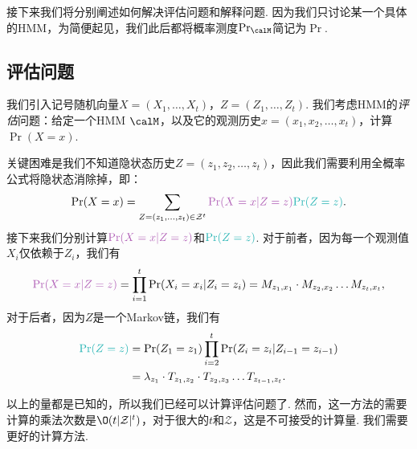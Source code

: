 接下来我们将分别阐述如何解决评估问题和解释问题. 因为我们只讨论某一个具体的HMM，为简便起见，我们此后都将概率测度$\Pr_\calM$简记为$\Pr$.

\subsection{评估问题}

我们引入记号随机向量$X=(X_1,\dots,X_t)$，$Z=(Z_1,\dots,Z_t)$. 我们考虑HMM的\emph{评估}问题：给定一个HMM $\calM$，以及它的观测历史$x=(x_1,x_2,\dots,x_t)$，计算$\Pr(X=x)$. 

关键困难是我们不知道隐状态历史$Z=(z_1,z_2,\dots,z_t)$，因此我们需要利用全概率公式将隐状态消除掉，即：
\[
    \Pr(X=x) =\sum_{Z=(z_1, \dots, z_t) \in \mathcal Z^t} \textcolor{Orchid}{\Pr(X=x|Z=z)}\textcolor{TealBlue}{\Pr(Z=z)}.
\]
接下来我们分别计算$\textcolor{Orchid}{\Pr(X=x|Z=z)}$和$\textcolor{TealBlue}{\Pr(Z=z)}$. 对于前者，因为每一个观测值$X_i$仅依赖于$Z_i$，我们有
\[
    \textcolor{Orchid}{\Pr(X=x|Z=z)} = \prod_{i=1}^t \Pr(X_i = x_i| Z_i = z_i) = M_{z_1,x_1}\cdot M_{z_2,x_2}\dots M_{z_t,x_t},
\]
对于后者，因为$Z$是一个Markov链，我们有
\begin{align*}
    \textcolor{TealBlue}{\Pr(Z=z)} &= \Pr(Z_1 = z_1) \prod_{i=2}^t\Pr(Z_i = z_i| Z_{i-1} = z_{i-1}) 
    \\
    &= \lambda_{z_1}\cdot T_{z_1,z_2}\cdot T_{z_2,z_3}\dots T_{z_{t-1},z_t}.
\end{align*}

以上的量都是已知的，所以我们已经可以计算评估问题了. 然而，这一方法的需要计算的乘法次数是$\O(t|\mathcal Z|^t)$，对于很大的$t$和$\mathcal Z$，这是不可接受的计算量. 我们需要更好的计算方法.

